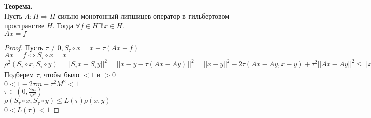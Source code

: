 \documentclass[__main__.tex]{subfiles}
\begin{document}
\textbf{Теорема.}\\
Пусть $A: H \Rightarrow H$ сильно монотонный липшицев оператор в гильбертовом пространстве $H$. Тогда $\forall f \in H \exists ! x \in H$.\\
$Ax = f$
\begin{proof}
    Пусть $\tau \neq 0, S_{\tau} \circ x = x - \tau(Ax-f)$\\
    $Ax = f \Leftrightarrow S_{\tau} \circ x = x$\\
    $\rho^2 (S_{\tau} \circ x, S_{\tau} \circ y) = ||S_{\tau}x - S_{\tau}y||^2 = ||x - y - \tau(Ax - Ay)||^2 = ||x-y||^2 - 2\tau (Ax - Ay,x-y) + \tau^2 ||Ax - Ay||^2 \leq ||x - y||^2 - 2\tau m ||x-y||^2 + \tau^2 M^2 ||x-y||^2 = (1-2\tau m + \tau^2 M^2) \rho^2 (x,y)$\\
    Подберем $\tau$, чтобы было $<1$ и $>0$\\
    $0 < 1-2\tau m + \tau^2 M^2 <1$\\
    $\tau \in (0,\frac{2m}{M^2})$\\
    $\rho (S_{\tau} \circ x, S_{\tau} \circ y) \leq L(\tau) \rho(x,y)$\\
    $0<L(\tau)<1$
\end{proof}
\end{document}
